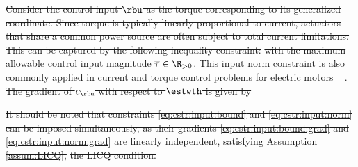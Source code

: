 \documentclass[letterpaper, journal]{IEEEtran}
\newcommand*{\template}{template}  %
\providecommand{\DIFdel}[1]{{\protect\color{red}\sout{#1}}} %
\providecommand{\DIFaddbegin}{} %
\providecommand{\DIFaddend}{} %
\providecommand{\DIFdelbegin}{} %
\providecommand{\DIFdelend}{} %
\begin{document}
\DIFdel{Consider the control input $\rbu$ as the torque corresponding to its generalized coordinate. 
Since torque is typically linearly proportional to current, actuators that share a common power source are often subject to total current limitations. 
This can be captured by the following inequality constraint: 
}%
\DIFdel{with the maximum allowable control input magnitude $\overline\tau\in\R_{>0}$. This input norm constraint is also commonly applied in current and torque control problems for electric motors \mbox{%
\cite{Choi:2024aa}}\hskip0pt%
.
The gradient of $c_{\rbu}$ with respect to $\estwth$ is given by
}%


\DIFdel{It should be noted that constraints \eqref{eq:cstr:input:bound} and \eqref{eq:cstr:input:norm} can be imposed simultaneously, as their gradients \eqref{eq:cstr:input:bound:grad} and \eqref{eq:cstr:input:norm:grad} are linearly independent, satisfying Assumption \ref{assum:LICQ}, }%
\DIFdel{the LICQ condition.
}%

\DIFdelend %

\DIFdelbegin %
\DIFdelend %
\DIFaddbegin 
\DIFaddend 
\end{document}
